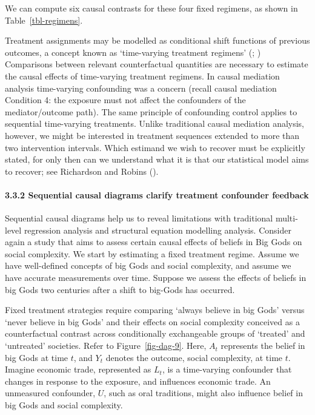 \documentclass[
  singlecolumn]{article}
\let\oldparagraph\paragraph
\renewcommand{\paragraph}[1]{\oldparagraph{#1}\mbox{}}
\begin{document}
We can compute six causal contrasts for these four fixed regimens, as
shown in Table~\ref{tbl-regimens}.

Treatment assignments may be modelled as conditional shift functions of
previous outcomes, a concept known as `time-varying treatment regimens'
(;
) Comparisons
between relevant counterfactual quantities are necessary to estimate the
causal effects of time-varying treatment regimens. In causal mediation
analysis time-varying confounding was a concern (recall causal mediation
Condition 4: the exposure must not affect the confounders of the
mediator/outcome path). The same principle of confounding control
applies to sequential time-varying treatments. Unlike traditional causal
mediation analysis, however, we might be interested in treatment
sequences extended to more than two intervention intervals. Which
estimand we wish to recover must be explicitly stated, for only then can
we understand what it is that our statistical model aims to recover; see
Richardson and Robins ().

\paragraph{3.3.2 Sequential causal diagrams clarify treatment confounder
feedback}\label{sequential-causal-diagrams-clarify-treatment-confounder-feedback}

Sequential causal diagrams help us to reveal limitations with
traditional multi-level regression analysis and structural equation
modelling analysis. Consider again a study that aims to assess certain
causal effects of beliefs in Big Gods on social complexity. We start by
estimating a fixed treatment regime. Assume we have well-defined
concepts of big Gods and social complexity, and assume we have accurate
measurements over time. Suppose we assess the effects of beliefs in big
Gods two centuries after a shift to big-Gods has occurred.

Fixed treatment strategies require comparing `always believe in big
Gods' versus `never believe in big Gods' and their effects on social
complexity conceived as a counterfactual contrast across conditionally
exchangeable groups of `treated' and `untreated' societies. Refer to
Figure~\ref{fig-dag-9}. Here, \(A_{t}\) represents the belief in big
Gods at time \(t\), and \(Y_{t}\) denotes the outcome, social
complexity, at time \(t\). Imagine economic trade, represented as
\(L_{t}\), is a time-varying confounder that changes in response to the
exposure, and influences economic trade. An unmeasured confounder,
\(U\), such as oral traditions, might also influence belief in big Gods
and social complexity.
\end{document}

